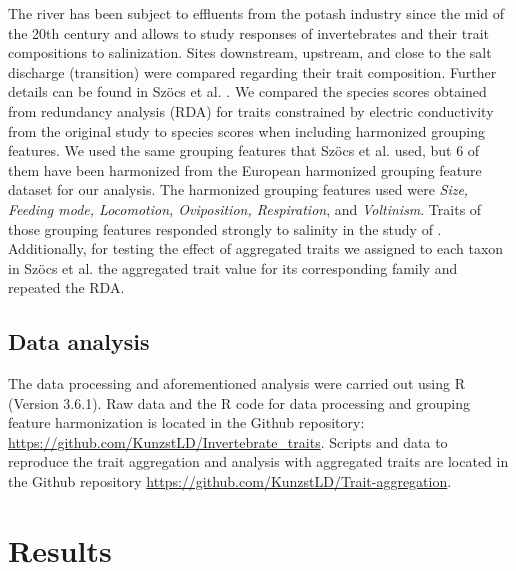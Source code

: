 \documentclass{article}
\begin{document}
The river has been subject to effluents from the potash industry since the mid of the 20th century and allows to study responses of invertebrates and their trait compositions to salinization. Sites downstream, upstream, and close to the salt discharge (transition) were compared regarding their trait composition. Further details can be found in Szöcs et al. \cite{szocs_effects_2014}. We compared the species scores obtained from redundancy analysis (RDA) for traits constrained by electric conductivity from the original study to species scores when including harmonized grouping features. We used the same grouping features that Szöcs et al. \cite{szocs_effects_2014} used, but 6 of them have been harmonized from the European harmonized grouping feature dataset for our analysis. The harmonized grouping features used were \textit{Size, Feeding mode, Locomotion, Oviposition, Respiration}, and \textit{Voltinism}. Traits of those grouping features responded strongly to salinity in the study of \cite{szocs_effects_2014}. Additionally, for testing the effect of aggregated traits we assigned to each taxon in Szöcs et al. \cite{szocs_effects_2014} the aggregated trait value for its corresponding family and repeated the RDA. 


\subsection*{Data analysis}

The data processing and aforementioned analysis were carried out using R (Version 3.6.1). Raw data and the R code for data processing and grouping feature harmonization is located in the Github repository: \url{https://github.com/KunzstLD/Invertebrate_traits}. Scripts and data to reproduce the trait aggregation and analysis with aggregated traits are located in the Github repository \url{https://github.com/KunzstLD/Trait-aggregation}.


\newpage
\section*{Results}
\end{document}

